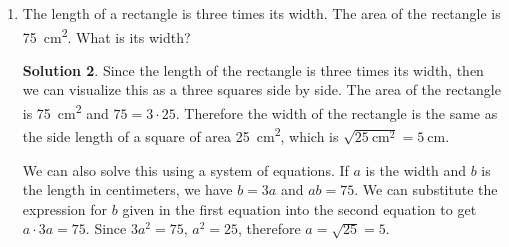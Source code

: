 \documentclass{article}
\theoremstyle{definition}
\newtheorem*{solution}{Solution}
\begin{document}
\begin{enumerate}
\begin{solution}
            Alternatively, we can also use a system of equations. If $a$ is the number of two point shots and $b$ is the number of three point shots, we have $a + b = 12$ and $2a + 3b = 34$. Multiplying the first equation by $-2$ gives $-2a - 2b = -24$, and adding this with the second equation gives $2a + 3b - 2a - 2b = 34 - 24$, so $b = 10$.
        \end{solution}
        \item The length of a rectangle is three times its width. The area of the rectangle is \SI{75}{\cm\squared}. What is its width?
        \begin{solution}
            Since the length of the rectangle is three times its width, then we can visualize this as a three squares side by side. The area of the rectangle is \SI{75}{\cm\squared} and $75 = 3 \cdot 25$. Therefore the width of the rectangle is the same as the side length of a square of area \SI{25}{\cm\squared}, which is $\sqrt{\SI{25}{\cm\squared}} = \SI{5}{\cm}$.

            We can also solve this using a system of equations. If $a$ is the width and $b$ is the length in centimeters, we have $b = 3a$ and $ab = 75$. We can substitute the expression for $b$ given in the first equation into the second equation to get $a \cdot 3a = 75$. Since $3a^2 = 75$, $a^2 = 25$, therefore $a = \sqrt{25} = 5$.
        \end{solution}
    \end{enumerate}
\end{document}
